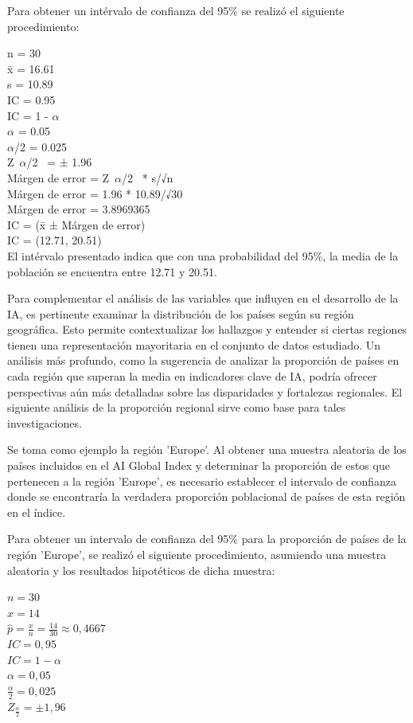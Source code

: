 \documentclass[
]{article}
\begin{document}
\begin{multicols}{2}
Para obtener un intérvalo de confianza del 95\% se realizó el siguiente procedimiento:




n = 30\\
x̄ = 16.61\\
s = 10.89\\
IC = 0.95\\
IC = 1 - $\alpha$\\
$\alpha$ = 0.05\\
$\alpha$/2 = 0.025\\
Z~$\alpha$/2~ = ± 1.96\\
Márgen de error = Z~$\alpha$/2~ * s/√n\\
Márgen de error = 1.96 * 10.89/√30\\
Márgen de error = 3.8969365\\
IC = (x̄ ± Márgen de error)\\
IC = (12.71,  20.51)\\

El intérvalo presentado indica que con una probabilidad del 95\%, la media de la población se encuentra entre 12.71 y 20.51.

Para complementar el análisis de las variables que influyen en el desarrollo de la IA, es pertinente examinar la distribución de los países según su región geográfica. Esto permite contextualizar los hallazgos y entender si ciertas regiones tienen una representación mayoritaria en el conjunto de datos estudiado. Un análisis más profundo, como la sugerencia de analizar la proporción de países en cada región que superan la media en indicadores clave de IA, podría ofrecer perspectivas aún más detalladas sobre las disparidades y fortalezas regionales. El siguiente análisis de la proporción regional sirve como base para tales investigaciones.

Se toma como ejemplo la región 'Europe'. Al obtener una muestra aleatoria de los países incluidos en el AI Global Index y determinar la proporción de estos que pertenecen a la región 'Europe', es necesario establecer el intervalo de confianza donde se encontraría la verdadera proporción poblacional de países de esta región en el índice.

Para obtener un intervalo de confianza del 95\% para la proporción de países de la región 'Europe', se realizó el siguiente procedimiento, asumiendo una muestra aleatoria y los resultados hipotéticos de dicha muestra:

$n = 30$\\
$x = 14$\\
$\hat{p} = \frac{x}{n} = \frac{14}{30} \approx 0,4667$\\
$IC = 0,95$\\
$IC = 1 - \alpha$\\
$\alpha = 0,05$\\
$\frac{\alpha}{2} = 0,025$\\
$Z_{\frac{\alpha}{2}} = \pm 1,96$\\


\end{multicols}
\end{document}
